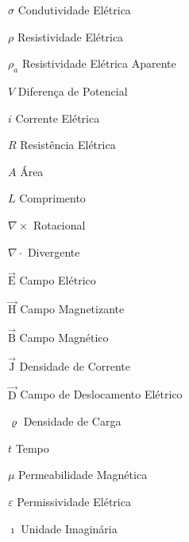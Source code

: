 \documentclass[12pt,twoside,oneright,a4paper,chapter=TITLE,english,brazil]{unipampa}
\newcommand{\vetor}[1]{\vec{\textrm{#1}}}
\begin{document}
\begin{simbolos}
    \item[$\sigma$]                  Condutividade Elétrica
    \item[$\rho$]                    Resistividade Elétrica
    \item[$\rho_a$]                  Resistividade Elétrica Aparente
    \item[$V$]                       Diferença de Potencial
    \item[$i$]                       Corrente Elétrica
    \item[$R$]                       Resistência Elétrica
    \item[$A$]                       Área
    \item[$L$]                       Comprimento
    \item[$\nabla \times$]           Rotacional
    \item[$\nabla \cdot$]            Divergente
    \item[$\vetor{E}$]               Campo Elétrico
    \item[$\vetor{H}$]               Campo Magnetizante
    \item[$\vetor{B}$]               Campo Magnético
    \item[$\vetor{J}$]               Densidade de Corrente
    \item[$\vetor{D}$]               Campo de Deslocamento Elétrico
    \item[$\varrho$]                 Densidade de Carga
    \item[$t$]                       Tempo
    \item[$\mu$]                     Permeabilidade Magnética
    \item[$\varepsilon$]             Permissividade Elétrica
    \item[$\imath$]                  Unidade Imaginária                   
\end{simbolos}


\tableofcontents       %
\end{document}
